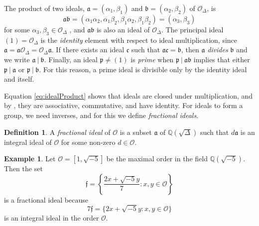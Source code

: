 \documentclass{ucalgthes1}
\theoremstyle{definition}
\newtheorem{defn}[thm]{Definition}
\newtheorem{example}[thm]{Example}
\newcommand{\QQ}{\mathbb{Q}}
\newcommand{\OO}{\mathcal{O}}
\newcommand{\ideal}{\mathfrak}
\begin{document}
The product of two ideals, $\ideal a = (\alpha_1, \beta_1)$ and $\ideal b = (\alpha_2, \beta_2)$ of $\OO_\Delta$, is
\begin{equation}
	\ideal a \ideal b = (\alpha_1 \alpha_2, \alpha_1 \beta_2, \beta_1 \alpha_2, \beta_1 \beta_2) = (\alpha_3, \beta_3) \label{eq:idealProduct}
\end{equation}
for some $\alpha_3, \beta_3 \in \OO_\Delta$ \cite[Definition 4.27]{Jacobson2009}, and $\ideal a \ideal b$ is also an ideal of $\OO_\Delta$. The principal ideal $(1) = \OO_\Delta$ is the \emph{identity} element with respect to ideal multiplication, since $\ideal a = \ideal a \OO_\Delta = \OO_\Delta \ideal a$.  If there exists an ideal $\ideal c$ such that $\ideal a \ideal c = \ideal b$, then $\ideal a$ \emph{divides} $\ideal b$ and we write $\ideal a ~|~ \ideal b$.  Finally, an ideal $\ideal p \neq (1)$ is \emph{prime} when $\ideal p ~|~ \ideal a \ideal b$ implies that either $\ideal p ~|~ \ideal a$ or $\ideal p ~|~ \ideal b$.  For this reason, a prime ideal is divisible only by the identity ideal and itself.

Equation \eqref{eq:idealProduct} shows that ideals are closed under multiplication, and by \cite[p.117]{Cohn1980}, they are associative, commutative, and have identity.  For ideals to form a group, we need inverses, and for this we define \emph{fractional ideals}.

\begin{defn} \cite[Definition 2.23]{Sawilla2004}
A \emph{fractional ideal} of $\OO$ is a subset $\ideal a$ of $\QQ(\sqrt \Delta)$ such that $d \ideal a$ is an integral ideal of $\OO$ for some non-zero $d \in \OO$.
\end{defn}

\begin{example}
Let $\OO = [1, \sqrt{-5}]$ be the maximal order in the field $\QQ(\sqrt{-5})$.  Then the set
\[
\ideal f = \left \{ \frac{2 x + \sqrt{-5} y}{7} : x,y \in \OO \right \}
\]
is a fractional ideal because
\[
	7 \ideal f = \{2x + \sqrt{-5} y : x, y \in \OO\}
\]
is an integral ideal in the order $\OO$.
\end{example}
\end{document}
